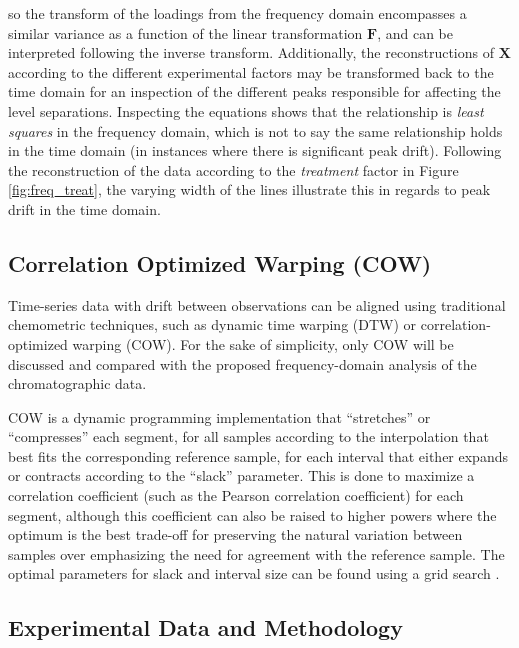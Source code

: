 \documentclass[preprint,12pt]{elsarticle}
\begin{document}
\noindent so the transform of the loadings from the frequency domain encompasses a similar variance as a function of the linear transformation $\mathbf{F}$, and can be interpreted following the inverse transform. Additionally, the reconstructions of $\mathbf{X}$ according to the different experimental factors may be transformed back to the time domain for an inspection of the different peaks responsible for affecting the level separations. Inspecting the equations shows that the relationship is \textit{least squares} in the frequency domain, which is not to say the same relationship holds in the time domain (in instances where there is significant peak drift). Following the reconstruction of the data according to the \textit{treatment} factor in Figure \ref{fig:freq_treat}, the varying width of the lines illustrate this in regards to peak drift in the time domain.

\subsection{Correlation Optimized Warping (COW)}

Time-series data with drift between observations can be aligned using traditional chemometric techniques, such as dynamic time warping (DTW)\cite{wang1987time} or correlation-optimized warping (COW)\cite{nielsen1998aligning}. For the sake of simplicity, only COW will be discussed and compared with the proposed frequency-domain analysis of the chromatographic data.

COW is a dynamic programming implementation that ``stretches'' or ``compresses'' each segment, for all samples according to the interpolation that best fits the corresponding reference sample, for each interval that either expands or contracts according to the ``slack'' parameter. This is done to maximize a correlation coefficient (such as the Pearson correlation coefficient) for each segment, although this coefficient can also be raised to higher powers where the optimum is the best trade-off for preserving the natural variation between samples over emphasizing the need for agreement with the reference sample. The optimal parameters for slack and interval size can be found using a grid search \cite{skov2006automated, tomasi2004correlation}.

\subsection{Experimental Data and Methodology}
\end{document}
